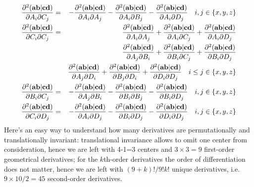 \documentclass[10pt]{article}
\begin{document}
\begin{eqnarray} \label{eqn:TId2eri_AC}
\frac{\partial^2 ({\bf ab}|{\bf cd})}{\partial A_i \partial C_j} & = & - \frac{\partial^2 ({\bf ab}|{\bf cd})}{\partial A_i \partial A_j} -
\frac{\partial^2 ({\bf ab}|{\bf cd})}{\partial A_i \partial B_j} - \frac{\partial^2 ({\bf ab}|{\bf cd})}{\partial A_i \partial D_j} \quad i,j \in \{x,y,z\} \\
\label{eqn:TId2eri_CC}
\frac{\partial^2 ({\bf ab}|{\bf cd})}{\partial C_i \partial C_j} & = & \frac{\partial^2 ({\bf ab}|{\bf cd})}{\partial A_i \partial A_j} +
\frac{\partial^2 ({\bf ab}|{\bf cd})}{\partial A_i \partial C_j} + \frac{\partial^2 ({\bf ab}|{\bf cd})}{\partial A_i \partial D_j} \nonumber \\
& & \frac{\partial^2 ({\bf ab}|{\bf cd})}{\partial A_j \partial B_i} +
\frac{\partial^2 ({\bf ab}|{\bf cd})}{\partial B_i \partial C_j} + \frac{\partial^2 ({\bf ab}|{\bf cd})}{\partial B_i \partial D_j} \nonumber \\
& & \frac{\partial^2 ({\bf ab}|{\bf cd})}{\partial A_j \partial D_i} +
\frac{\partial^2 ({\bf ab}|{\bf cd})}{\partial B_j \partial D_i} + \frac{\partial^2 ({\bf ab}|{\bf cd})}{\partial D_i \partial D_j} \quad i \leq j \in \{x,y,z\} \\
\label{eqn:TId2eri_BC}
\frac{\partial^2 ({\bf ab}|{\bf cd})}{\partial B_i \partial C_j} & = & - \frac{\partial^2 ({\bf ab}|{\bf cd})}{\partial A_j \partial B_i} -
\frac{\partial^2 ({\bf ab}|{\bf cd})}{\partial B_i \partial B_j} - \frac{\partial^2 ({\bf ab}|{\bf cd})}{\partial B_i \partial D_j} \quad i,j \in \{x,y,z\} \\
\label{eqn:TId2eri_CD}
\frac{\partial^2 ({\bf ab}|{\bf cd})}{\partial C_i \partial D_j} & = & - \frac{\partial^2 ({\bf ab}|{\bf cd})}{\partial A_i \partial D_j} -
\frac{\partial^2 ({\bf ab}|{\bf cd})}{\partial B_i \partial D_j} - \frac{\partial^2 ({\bf ab}|{\bf cd})}{\partial D_i \partial D_j} \quad i,j \in \{x,y,z\} \\
\end{eqnarray}
Here's an easy way to understand how many derivatives are permutationally and translationally invariant:
translational invariance allows to omit one center from consideration, hence we are left with 4-1=3 centers and $3\times3 = 9$
first-order geometrical derivatives; for the $k$th-order derivatives the order of differentiation does not matter, hence
we are left with $(9+k)!/9!k!$ unique derivatives, i.e. $9 \times 10/2 = 45$ second-order derivatives.
\end{document}
